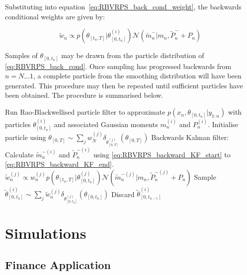 \documentclass[journal]{IEEEtran}
\begin{document}
Substituting into equation~\ref{eq:RBVRPS_back_cond_weight}, the backwards conditional weights are given by:

\begin{equation}
 \tilde{w}_n \propto p(\theta_{[t_n,T]}|\theta_{[0,t_n]}^{(i)}) \mathcal{N}(\tilde{m}_n^-|m_n, \tilde{P}_n^- + P_n)
\label{eq:RBVRPS_back_cond_weight2}
\end{equation}

Samples of $\theta_{[0,t_n]}$ may be drawn from the particle distribution of \ref{eq:RBVRPS_back_cond}. Once sampling has progressed backwards from $n=N \dots 1$, a complete particle from the smoothing distribution will have been generated. This procedure may then be repeated until sufficient particles have been obtained. The procedure is summarised below.%

\begin{algorithmic}
  \STATE Run Rao-Blackwellised particle filter to approximate $p(x_n, \theta_{[0,t_n]}|y_{1:n})$ with particles $\theta_{[0,t_n]}^{(i)}$ and associated Gaussian moments $m_{n}^{(i)}$ and $P_{n}^{(i)}$.
  	\STATE Initialise particle using $\theta_{[0,T]} \sim \sum_j w_N^{(j)} \delta_{\theta_{[0,T]}^{(j)}}(\theta_{[0,T]})$
      \STATE Backwards Kalman filter: Calculate $\tilde{m}_n^{-(i)}$ and $\tilde{P}_n^{-(i)}$ using \ref{eq:RBVRPS_backward_KF_start} to \ref{eq:RBVRPS_backward_KF_end}.
	      \STATE $\tilde{w}_n^{(j)} \propto w_n^{(j)} p(\theta_{[t_n,T]}|\theta_{[0,t_n]}^{(j)}) \mathcal{N}(\tilde{m}_n^{-(j)}|m_n, \tilde{P}_n^{-(j)} + P_n)$
      \ENDFOR
      \STATE Sample $\tilde{\theta}_{[0,t_n]}^{(i)} \sim \sum_j \tilde{w}_n^{(j)} \delta_{\theta_{[0,t_n]}^{(j)}}(\theta_{[0,t_n]})$
      \STATE Discard $\tilde{\theta}_{[0,t_{n-1}]}^{(i)}$
    \ENDFOR
  \ENDFOR
\end{algorithmic}



\section{Simulations} \label{sec:simulations}

\subsection{Finance Application}
\end{document}

